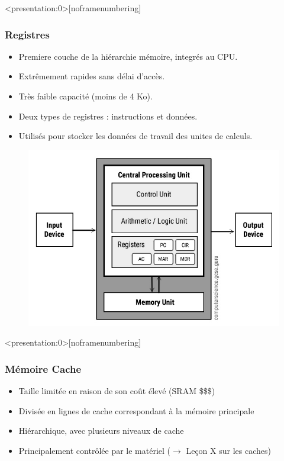 \documentclass[8pt]{beamer}
\begin{document}
\begin{frame}<presentation:0>[noframenumbering]
    \frametitle{Registres}
    \begin{itemize}
        \item Premiere couche de la hiérarchie mémoire, integr\'es au CPU.
        \item Extrêmement rapides sans délai d'accès.
        \item Très faible capacité (moins de 4 Ko).
        \item Deux types de registres : instructions et données.
        \item Utilisés pour stocker les données de travail des unites de
              calculs.
    \end{itemize}
    \begin{figure}
        \centering

        \includegraphics[width=.45\textwidth]{figures/Von-Neumann-Architecture-Diagram.jpg}
        \label{fig:sub1}
    \end{figure}

\end{frame}
\begin{frame}<presentation:0>[noframenumbering]
    \frametitle{Mémoire Cache}
    \begin{itemize}
        \item Taille limitée en raison de son coût élevé (SRAM \$\$\$)
        \item Divisée en lignes de cache correspondant \`a la m\'emoire
              principale
        \item Hiérarchique, avec plusieurs niveaux de cache
        \item Principalement contrôlée par le matériel ($\to$ Le\c{c}on X sur
              les caches)
    \end{itemize}
\end{frame}
\end{document}
